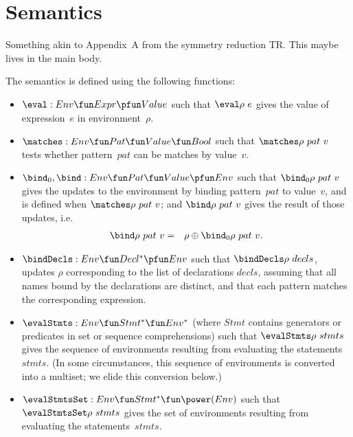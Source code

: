 \section{Semantics}
\label{sec:semantics}

Something akin to Appendix~A from the symmetry reduction TR.  This maybe lives
in the main body. 

The semantics is defined using the following functions:
%
\begin{itemize}
\item $\eval : Env \fun Expr \pfun Value$ such that $\eval \rho~e$ gives the
  value of expression~$e$ in environment~$\rho$.

\item $\matches : Env \fun Pat \fun Value \fun Bool$ such that
  $\matches \rho~pat ~ v$ tests whether pattern~$pat$ can be matches by
  value~$v$.

\item $\bind_0, \bind : Env \fun Pat \fun Value \pfun Env$ such that
  $\bind_0 \rho~pat~v$ gives the updates to the environment by binding
  pattern~$pat$ to value~$v$, and is defined when $\matches \rho~ pat~v$; and 
  $\bind \rho~pat~v$ gives the result of those updates, i.e.
  \begin{eqnarray*}
  \bind \rho~pat~v & = & \rho \oplus \bind_0 \rho~pat~v.
  \end{eqnarray*}

\item $\bindDecls : Env \fun Decl^* \pfun Env$ such that
  $\bindDecls \rho~decls$, updates $\rho$ corresponding to the list of
  declarations $decls$, assuming that all names bound by the declarations are
  distinct, and that each pattern matches the corresponding expression.

\item $\evalStmts : Env \fun Stmt^* \fun Env^*$ (where $Stmt$ contains
  generators or predicates in set or sequence comprehensions) such that
  $\evalStmts \rho~stmts$ gives the sequence of environments resulting from
  evaluating the statements~$stmts$.  (In some circumstances, this sequence of
  environments is converted into a multiset; we elide this conversion
  below.)

\item $\evalStmtsSet : Env \fun Stmt^* \fun \power(Env)$ such that
  $\evalStmtsSet \rho~stmts$ gives the set of environments resulting from
  evaluating the statements~$stmts$.
\end{itemize}
